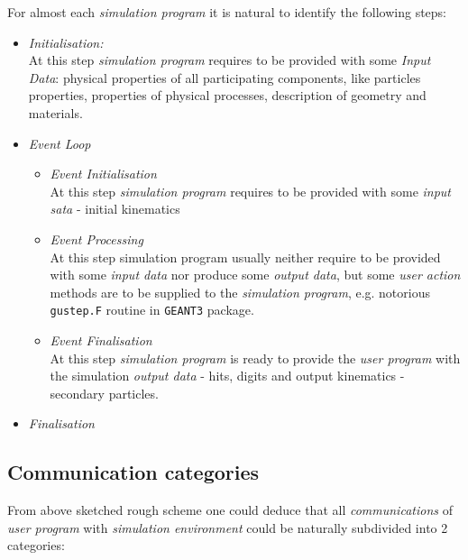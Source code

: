\documentclass[nfss,times,12pt,a4paper]{article}
\begin{document}
{For almost each {\it simulation program} it is natural to 
identify the following steps: 	
\begin{itemize} 	
\item {\it Initialisation: }        \\ 
        At this step  {\it simulation program} requires 
        to be provided with some {\it Input Data}: 
        physical properties of all participating 
        components, like 
        particles properties, properties of
        physical processes, description of  
        geometry and materials.            
\item {\it Event Loop     } 
\begin{itemize}	
  \item {\it Event Initialisation } \\ 
          At this step  {\it simulation program} requires 
          to be provided with some {\it input sata} - initial kinematics 
  \item {\it Event Processing     } \\
          At this step simulation program usually neither  
          require to be provided with some {\it input data} 
          nor produce some {\it output data}, but some 
          {\it user action} methods are to be supplied 
          to the {\it simulation program},
          e.g. notorious  {\tt gustep.F} routine 
          in {\tt GEANT3} package.  
  \item {\it Event Finalisation   } \\    
          At this step  {\it simulation program} is ready to provide  
          the {\it user program} with the simulation {\sl output data} 
          - hits, digits and output kinematics - secondary particles. 
\end{itemize} 
\item {\it Finalisation   } 
\end{itemize} 

\subsection  { Communication categories } 

From above sketched rough scheme one could deduce 
that all {\it communications} of {\it user program} 
with {\it simulation environment} could be naturally 
subdivided into 2 categories:

}
\end{document}
